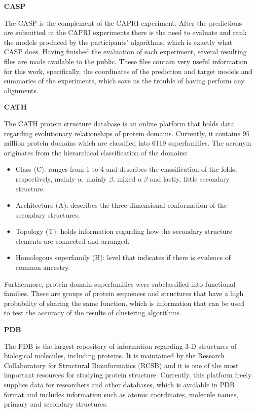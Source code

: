 \medskip
\textbf{CASP}

The \gls{CASP} \cite{moult1995large} is the complement of the CAPRI experiment. After the predictions are submitted in the CAPRI experiments there is the need to evaluate and rank the models produced by the participants' algorithms, which is exactly what \gls{CASP} does. Having finished the evaluation of each experiment, several resulting files are made available to the public. These files contain very useful information for this work, specifically, the coordinates of the prediction and target models and summaries of the experiments, which save us the trouble of having perform any alignments. 

\medskip
\textbf{CATH}

The \gls{CATH} \cite{sillitoe2014cath} protein structure database is an online platform that holds data regarding evolutionary relationships of protein domains. Currently, it contains 95 million protein domains which are classified into 6119 superfamilies. The acronym originates from the hierarchical classification of the domains: 
\begin{itemize}
 	\item Class (C): ranges from 1 to 4 and describes the classification of the folds, respectively, mainly $\alpha$, mainly $\beta$, mixed $\alpha \ \beta$ and lastly, little secondary structure.
 	\item Architecture (A): describes the three-dimensional conformation of the secondary structures.
 	\item Topology (T): holds information regarding how the secondary structure elements are connected and arranged.
 	\item Homologous superfamily (H): level that indicates if there is evidence of common ancestry.
\end{itemize}

Furthermore, protein domain superfamilies were subclassified into functional families. These are groups of protein sequences and structures that have a high probability of sharing the same function, which is information that can be used to test the accuracy of the results of clustering algorithms.

\medskip
\textbf{PDB}

The \gls{PDB} \cite{berman2000protein} is the largest repository of information regarding 3-D structures of biological molecules, including proteins. It is maintained by the Research Collaboratory for Structural Bioinformatics (RCSB) and it is one of the most important resources for studying protein structure. Currently, this platform freely supplies data for researchers and other databases, which is available in \gls{PDB} format and includes information such as atomic coordinates, molecule names, primary and secondary structures. 


